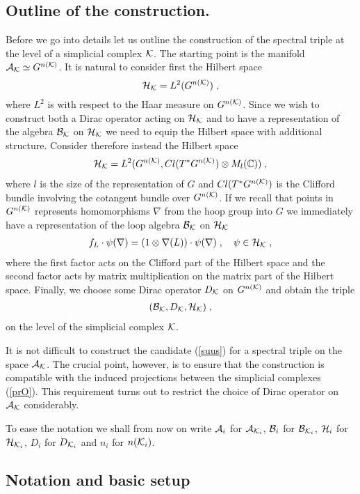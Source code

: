 \documentclass[12pt]{article}
\newcommand{\ba}{\begin{eqnarray}}
\newcommand{\ea}{\end{eqnarray}}
\def\ca{{\cal A}}
\def\cb{{\cal B}}
\def\ch{{\cal H}}
\def\ck{{\cal K}}
\newcommand{\One}{{\boldmath 1}}
\begin{document}
\subsection{Outline of the construction.}


Before we go into details let us outline the construction of the spectral triple at the level of a simplicial complex $\ck$. The starting point is the manifold $\ca_{\ck}\simeq G^{n(\ck)}$. It is natural to consider first the Hilbert space
\[
\ch_\ck= L^2(G^{n(\ck)})\;,
\]
where $L^2$ is with respect to the Haar measure on $G^{n(\ck)}$. Since we wish to construct both a Dirac operator acting on $\ch_\ck$ and to have a representation of the algebra $\cb_\ck$ on $\ch_\ck$ we need to equip the Hilbert space with additional structure. Consider therefore instead the Hilbert space
\ba
\ch_\ck= L^2(G^{n(\ck)},Cl(T^*G^{n(\ck)})\otimes M_l(\mathbb{C}))\;,
\label{Hilbert}
\ea
where $l$ is the size of the representation of $G$ and $Cl(T^*G^{n(\ck)})$ is the Clifford bundle involving the cotangent bundle over $G^{n(\ck)}$. If we recall that points in $G^{n(\ck)}$ represents homomorphisms $\nabla$ from the hoop group into $G$ we immediately have a representation of the loop algebra $\cb_\ck$ on $\ch_\ck$
\ba
f_L\cdot \psi(\nabla)= (\One\otimes\nabla(L))\cdot\psi(\nabla)\;,\quad \psi\in\ch_\ck\;,
\label{rep}
\ea
where the first factor acts on the Clifford part of the Hilbert space and the second factor acts by matrix multiplication on the matrix part of the Hilbert space. Finally, we choose some Dirac operator $D_\ck$ on $G^{n(\ck)}$ and obtain the triple
\ba
(\cb_\ck,D_\ck,\ch_\ck)\;,
\label{suus}
\ea
on the level of the simplicial complex $\ck$.


It is not difficult to construct the candidate (\ref{suus}) for a spectral triple on the space $\ca_{\ck}$. The crucial point, however, is to ensure that the construction is compatible with the induced projections between the simplicial complexes (\ref{prO}). This requirement turns out to restrict the choice of Dirac operator on $\ca_\ck$ considerably.

To ease the notation we shall from now on write $\ca_i$ for $\ca_{\ck_i}$, $\cb_i$ for $\cb_{\ck_i}$, $\ch_i$ for $\ch_{\ck_i}$, $D_i$ for $D_{\ck_i}$ and $n_i$ for $n(\ck_i)$.












\subsection{Notation and basic setup}
\end{document}
